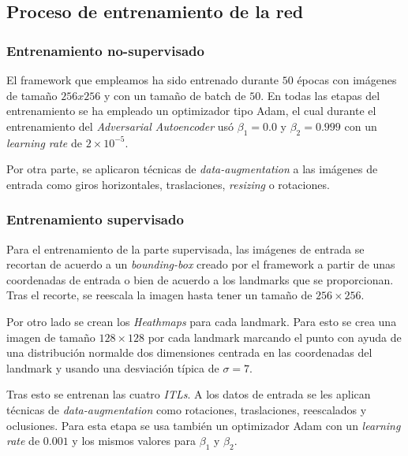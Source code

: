         \subsection{Proceso de entrenamiento de la red}

            \subsubsection{Entrenamiento no-supervisado}
                \noindent El framework que empleamos ha sido entrenado durante $50$ épocas con imágenes de tamaño $256x256$ y con un tamaño de batch de $50$. En todas las etapas del entrenamiento se ha empleado un optimizador tipo Adam, el cual durante el entrenamiento del \textit{Adversarial Autoencoder} usó $\beta_1=0.0$ y $\beta_2=0.999$ con un \textit{learning rate} de $2\times 10^{-5}$.

                \medskip

                \noindent Por otra parte, se aplicaron técnicas de \textit{data-augmentation} a las imágenes de entrada como giros horizontales, traslaciones, \textit{resizing} o rotaciones.

            \subsubsection{Entrenamiento supervisado}
                \noindent Para el entrenamiento de la parte supervisada, las imágenes de entrada se recortan de acuerdo a un \textit{bounding-box} creado por el framework a partir de unas coordenadas de entrada o bien de acuerdo a los landmarks que se proporcionan. Tras el recorte, se reescala la imagen hasta tener un tamaño de $256\times256$. 
                
                \medskip

                \noindent Por otro lado se crean los \textit{Heathmaps} para cada landmark. Para esto se crea una imagen de tamaño $128 \times 128$ por cada landmark marcando el punto con ayuda de una distribución normalde dos dimensiones centrada en las coordenadas del landmark y usando una desviación típica de $\sigma=7$.

                \medskip

                \noindent Tras esto se entrenan las cuatro \textit{ITLs}. A los datos de entrada se les aplican técnicas de \textit{data-augmentation} como rotaciones, traslaciones, reescalados y oclusiones. Para esta etapa se usa también un optimizador Adam con un \textit{learning rate} de $0.001$ y los mismos valores para $\beta_1$ y $\beta_2$.

